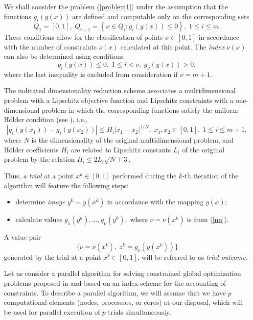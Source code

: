 \documentclass[
11pt,%
tightenlines,%
twoside,%
onecolumn,%
nofloats,%
nobibnotes,%
nofootinbib,%
superscriptaddress,%
noshowpacs,%
centertags]%
{revtex4}
\begin{document}
We shall consider the problem (\ref{problem1}) under the assumption that the functions $g_i(y(x))$ are defined and computable only on the corresponding sets
\[
Q_1=[0,1], \; Q_{i+1}=\left\{x \in Q_i : g_i(y(x)) \leq 0 \right\}, \; 1 \leq i \leq m.
\]
These conditions allow for the classification of points $x \in
[0,1]$ in accordance with the number of constraints $\nu(x)$
calculated at this point. The \textit{index} $\nu(x)$ can also be
determined using conditions
\begin{equation}\label{nu}
g_i(y(x)) \leq 0, \; 1 \leq i < \nu, \; g_\nu(y(x))>0,
\end{equation}
where the last inequality is excluded from consideration if  $\nu=m+1$.

The indicated dimensionality reduction scheme associates a multidimensional problem with a Lipschitz objective function and Lipschitz constraints with a one-dimensional problem in which the corresponding functions satisfy the uniform  H{\"o}lder condition (see \cite{Sergeyev2013}), i.e.,
\[
\left|g_i(y(x_1))-g_i (y(x_2))\right| \leq H_i \left|x_1-x_2 \right|^{1/N}, \; x_1,x_2\in [0,1], \; 1\leq i \leq m+1,
\]
where $N$ is the dimensionality of the original multidimensional problem, and H{\"o}lder coefficients $H_i$ are related to Lipschitz constants $L_i$ of the original problem by the relation  $H_i \leq 2L_i \sqrt{N+3}$.

Thus, \textit{a trial} at a point $x^k \in [0,1]$ performed during the $k$-th iteration of the algorithm will feature the following steps:
\begin{itemize}
    \item determine \textit{image} $y^k=y(x^k)$ in accordance with the mapping $y(x)$;
    \item calculate values $g_1(y^k),..., g_\nu(y^k),$ where $\nu = \nu(x^k)$ is from (\ref{nu}).
\end{itemize}
A value pair
\begin{equation} \label{trial_result}
 \{ \nu=\nu(x^k), \; z^k=g_\nu(y(x^k)) \}
\end{equation}
generated by the trial at a point $x^k \in [0,1]$, will be referred to as \textit{trial outcome}.

Let us consider a parallel algorithm for solving constrained global optimization problems proposed in  \cite{Strongin2000,Strongin2013} and based on an index scheme for the accounting of constraints.
To describe a parallel algorithm, we will assume that we have $p$ computational elements (nodes, processors, or cores) at our disposal, which will be used for parallel execution of $p$ trials simultaneously.
\end{document}
